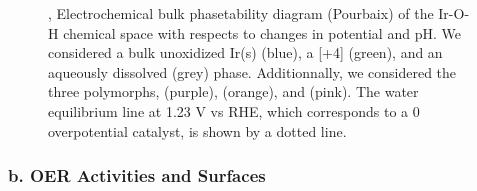 \begin{figure}
\centering
{}
\caption{\label{fig:bulk_pourbaix},
Electrochemical bulk phasetability diagram (Pourbaix) of the Ir-O-H chemical space with respects to changes in potential and pH.
We considered a bulk unoxidized Ir(s) (blue), a [+4] \rIrOtwo  (green), and an aqueously dissolved  (grey) phase.
Additionnally, we considered the three  polymorphs, \aIrOthree (purple), \rIrOthree (orange), and \bIrOthree (pink).
The water equilibrium line at 1.23 V vs RHE, which corresponds to a 0 overpotential catalyst, is shown by a dotted line.
}
\end{figure}


\subsubsection{b. OER Activities and Surfaces}

